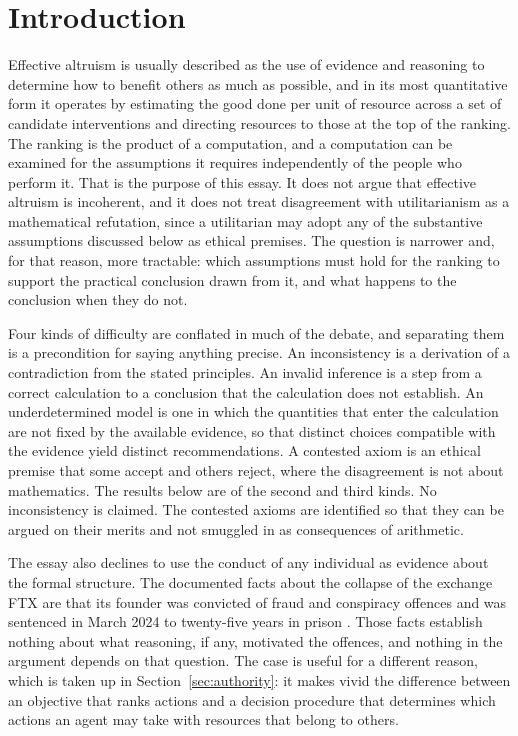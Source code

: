 \documentclass[11pt]{article}
\theoremstyle{definition}
\theoremstyle{remark}
\begin{document}
\clearpage

\section{Introduction}

Effective altruism is usually described as the use of evidence and reasoning to determine how to benefit others as much as possible, and in its most quantitative form it operates by estimating the good done per unit of resource across a set of candidate interventions and directing resources to those at the top of the ranking. The ranking is the product of a computation, and a computation can be examined for the assumptions it requires independently of the people who perform it. That is the purpose of this essay. It does not argue that effective altruism is incoherent, and it does not treat disagreement with utilitarianism as a mathematical refutation, since a utilitarian may adopt any of the substantive assumptions discussed below as ethical premises. The question is narrower and, for that reason, more tractable: which assumptions must hold for the ranking to support the practical conclusion drawn from it, and what happens to the conclusion when they do not.

Four kinds of difficulty are conflated in much of the debate, and separating them is a precondition for saying anything precise. An inconsistency is a derivation of a contradiction from the stated principles. An invalid inference is a step from a correct calculation to a conclusion that the calculation does not establish. An underdetermined model is one in which the quantities that enter the calculation are not fixed by the available evidence, so that distinct choices compatible with the evidence yield distinct recommendations. A contested axiom is an ethical premise that some accept and others reject, where the disagreement is not about mathematics. The results below are of the second and third kinds. No inconsistency is claimed. The contested axioms are identified so that they can be argued on their merits and not smuggled in as consequences of arithmetic.

The essay also declines to use the conduct of any individual as evidence about the formal structure. The documented facts about the collapse of the exchange FTX are that its founder was convicted of fraud and conspiracy offences and was sentenced in March 2024 to twenty-five years in prison \citep{doj2024}. Those facts establish nothing about what reasoning, if any, motivated the offences, and nothing in the argument depends on that question. The case is useful for a different reason, which is taken up in Section~\ref{sec:authority}: it makes vivid the difference between an objective that ranks actions and a decision procedure that determines which actions an agent may take with resources that belong to others.
\end{document}
